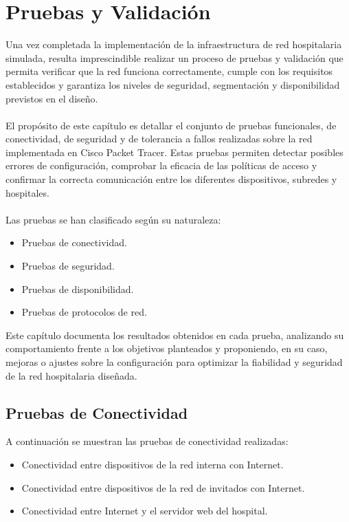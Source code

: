 
\chapter{Pruebas y Validación}\label{pruebas}
Una vez completada la implementación de la infraestructura de red hospitalaria simulada, resulta imprescindible realizar un proceso de pruebas y validación que permita 
verificar que la red funciona correctamente, cumple con los requisitos establecidos y garantiza los niveles de seguridad, segmentación y disponibilidad previstos en el diseño.
\\ \\ 
El propósito de este capítulo es detallar el conjunto de pruebas funcionales, de conectividad, de seguridad y de tolerancia a fallos realizadas sobre la red implementada en 
Cisco Packet Tracer. Estas pruebas permiten detectar posibles errores de configuración, comprobar la eficacia de las políticas de acceso y confirmar la correcta comunicación 
entre los diferentes dispositivos, subredes y hospitales.
\\ \\ 
Las pruebas se han clasificado según su naturaleza:
\begin{itemize}
    \item Pruebas de conectividad.
    \item Pruebas de seguridad.
    \item Pruebas de disponibilidad.
    \item Pruebas de protocolos de red.
\end{itemize}

Este capítulo documenta los resultados obtenidos en cada prueba, analizando su comportamiento frente a los objetivos planteados y proponiendo, en su caso, mejoras o ajustes sobre 
la configuración para optimizar la fiabilidad y seguridad de la red hospitalaria diseñada.

\section{Pruebas de Conectividad}
A continuación se muestran las pruebas de conectividad realizadas:
\begin{itemize}
    \item Conectividad entre dispositivos de la red interna con Internet.
    \item Conectividad entre dispositivos de la red de invitados con Internet.
    \item Conectividad entre Internet y el servidor web del hospital.
\end{itemize}

